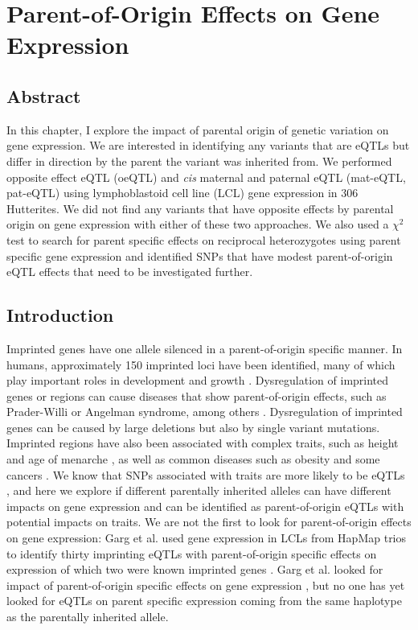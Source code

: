 
\chapter{Parent-of-Origin Effects on Gene Expression }\label{ch:poeqtl}
\section[Abstract]{Abstract}

In this chapter, I explore the impact of parental origin of genetic variation on gene expression. We are interested in identifying any variants that are eQTLs but differ in direction by the parent the variant was inherited from. We performed opposite effect eQTL (oeQTL) and \emph{cis} maternal and paternal eQTL (mat-eQTL, pat-eQTL) using lymphoblastoid cell line (LCL) gene expression in 306 Hutterites. We did not find any variants that have opposite effects by parental origin on gene expression with either of these two approaches. We also used a $\chi^2$ test to search for parent specific effects on reciprocal heterozygotes using parent specific gene expression and identified SNPs that have modest parent-of-origin eQTL effects that need to be investigated further.

\section{Introduction}\label{ch04-introduction}
Imprinted genes have one allele silenced in a parent-of-origin specific manner. In humans, approximately 150 imprinted loci have been identified, many of which play important roles in development and growth \citep{Falls1999,Peters2014,Benonisdottir:2016dz}. Dysregulation of imprinted genes or regions can cause diseases that show parent-of-origin effects, such as Prader-Willi or Angelman syndrome, among others \cite{Peters2014}. Dysregulation of imprinted genes can be caused by large deletions but also by single variant mutations. Imprinted regions have also been associated with complex traits, such as height and age of menarche \citep{Benonisdottir:2016dz,Zoledziewska:2015do}, as well as common diseases such as obesity and some cancers \citep{Peters2014}. We know that SNPs associated with traits are more likely to be eQTLs \citep{Nicolae2010}, and here we explore if different parentally inherited alleles can have different impacts on gene expression and can be identified as parent-of-origin eQTLs with potential impacts on traits. We are not the first to look for parent-of-origin effects on gene expression: Garg et al. used gene expression in LCLs from HapMap trios to identify thirty imprinting eQTLs with parent-of-origin specific effects on expression of which two were known imprinted genes \citep{Garg2012a}. Garg et al. looked for impact of parent-of-origin specific effects on gene expression \citep{Garg2012a}, but no one has yet looked for eQTLs on parent specific expression coming from the same haplotype as the parentally inherited allele. 
	

